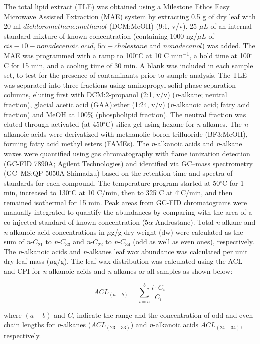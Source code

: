 \documentclass[
  authoryear,
  preprint,
  3p]{elsarticle}
\begin{document}
The total lipid extract (TLE) was obtained using a Milestone Ethos Easy
Microwave Assisted Extraction (MAE) system by extracting 0.5 g of dry
leaf with 20 ml \(dichloromethane\):\(methanol\) (DCM:MeOH) (9:1, v/v).
25 \(\mu L\) of an internal standard mixture of known concentration
(containing 1000 ng/\(\mu L\) of \(cis-10-nonadecenoic\) \(acid\),
\(5 \alpha-cholestane\) and \(nonadecanol\)) was added. The MAE was
programmed with a ramp to 100\(^\circ\)C at 10\(^\circ\)C min\(^{-1}\),
a hold time at 100\(^\circ\)C for 15 min, and a cooling time of 30 min.
A blank was included in each sample set, to test for the presence of
contaminants prior to sample analysis. The TLE was separated into three
fractions using aminopropyl solid phase separation columns, eluting
first with DCM:2-propanol (2:1, v/v) (\emph{n}-alkane; neutral
fraction), glacial acetic acid (GAA):ether (1:24, v/v)
(\emph{n}-alkanoic acid; fatty acid fraction) and MeOH at 100\(\%\)
(phospholipid fraction). The neutral fraction was eluted through
activated (at 450\(^\circ\)C) silica gel using hexane for
\emph{n}-alkanes. The \emph{n}-alkanoic acids were derivatized with
methanolic boron trifluoride (BF3:MeOH), forming fatty acid methyl
esters (FAMEs). The \emph{n}-alkanoic acids and \emph{n}-alkane waxes
were quantified using gas chromatography with flame ionization detection
(GC-FID 7890A; Agilent Technologies) and identified via GC--mass
spectrometry (GC--MS:QP-5050A-Shimadzu) based on the retention time and
spectra of standards for each compound. The temperature program started
at 50\(^\circ\)C for 1 min, increased to 130\(^\circ\)C at
10\(^\circ\)C/min, then to 325\(^\circ\)C at 4\(^\circ\)C/min, and then
remained isothermal for 15 min. Peak areas from GC-FID chromatograms
were manually integrated to quantify the abundances by comparing with
the area of a co-injected standard of known concentration
(5\(\alpha\)-Androstane). Total \emph{n}-alkane and \emph{n}-alkanoic
acid concentrations in \(\mu\)g/g dry weight (dw) were calculated as the
sum of \emph{n}-\(C_{21}\) to \emph{n}-\(C_{33}\) and
\emph{n}-\(C_{22}\) to \emph{n}-\(C_{34}\) (odd as well as even ones),
respectively. The \emph{n}-alkanoic acids and \emph{n}-alkanes leaf wax
abundance was calculated per unit dry leaf mass (\(\mu\)g/g). The leaf
wax distribution was calculated using the ACL and CPI for
\emph{n}-alkanoic acids and \emph{n}-alkanes or all samples as shown
below:

\[
ACL_{(a-b)} = \sum\limits_{i=a}^{b}\frac{i\cdot {C_{i}}}{C_{i}}
\]

where \((a-b)\) and \(C_{i}\) indicate the range and the concentration
of odd and even chain lengths for \emph{n}-alkanes (\(ACL_{(23-33)}\))
and \emph{n}-alkanoic acids \(ACL_{(24-34)}\), respectively.
\end{document}
